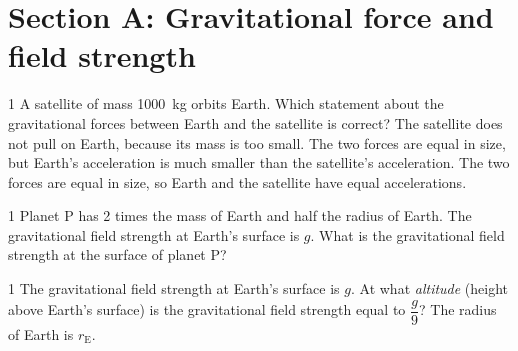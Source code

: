 
\section*{Section A: Gravitational force and field strength}

\begin{practiceq}{1}{}\label{bq:secA}
A satellite of mass \qty{1000}{kg} orbits Earth. Which statement about the gravitational forces
between Earth and the satellite is correct?
  {The satellite does not pull on Earth, because its mass is too small.}
  {The two forces are equal in size, but Earth's acceleration is much smaller than the
   satellite's acceleration.}
  {The two forces are equal in size, so Earth and the satellite have equal accelerations.}
\end{practiceq}

\begin{practiceq}{1}{}
Planet P has 2 times the mass of Earth and half the radius of Earth. The gravitational field
strength at Earth's surface is $g$. What is the gravitational field strength at the surface of
planet P?
\end{practiceq}

\begin{practiceq}{1}{}
The gravitational field strength at Earth's surface is $g$. At what \emph{altitude} (height above
Earth's surface) is the gravitational field strength equal to $\dfrac{g}{9}$? The radius of Earth is
$r_\mathrm{E}$.
\end{practiceq}

